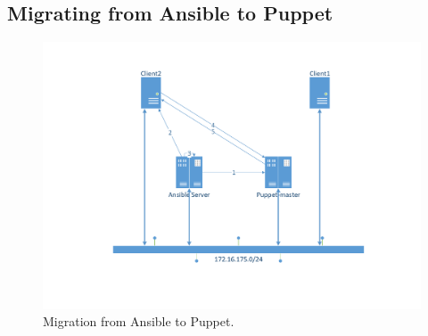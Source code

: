 \subsection{Migrating from Ansible to Puppet}\label{subsec:ansibletopuppet}

\begin{figure}[!hb]
        \includegraphics[scale=0.5]{img/AnsibletoPuppet.pdf}
        \caption{Migration from Ansible to Puppet.}
        \label{fig:situation2}
\end{figure}


